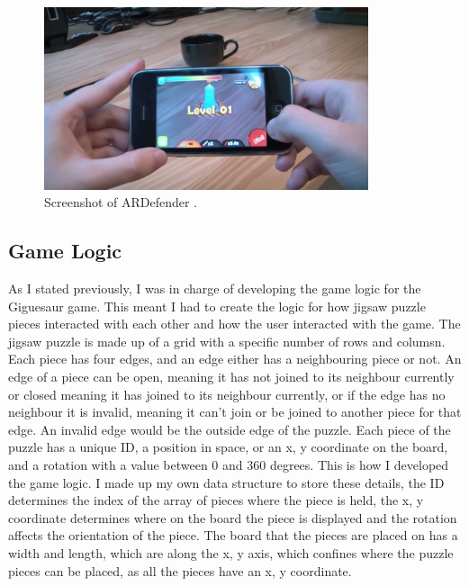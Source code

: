 \documentclass{article}
\begin{document}
\begin{figure}[ht]
\begin{center}
\includegraphics[width=0.85\textwidth]{images/ARDefenderImage}
\caption{Screenshot of ARDefender \cite{img:ARDefender}.}
\label{fig:ARDefender}
\end{center}
\end{figure}

\subsection{Game Logic}
As I stated previously, I was in charge of developing the game logic for the Giguesaur game. This meant I had to create the logic for how jigsaw puzzle pieces interacted with each other and how the user interacted with the game. The jigsaw puzzle is made up of a grid with a specific number of rows and columsn. Each piece has four edges, and an edge either has a neighbouring piece or not. An edge of a piece can be open, meaning it has not joined to its neighbour currently or closed meaning it has joined to its neighbour currently, or if the edge has no neighbour it is invalid, meaning it can't join or be joined to another piece for that edge. An invalid edge would be the outside edge of the puzzle. Each piece of the puzzle has a unique ID, a position in space, or an x, y coordinate on the board, and a rotation with a value between 0 and 360 degrees. This is how I developed the game logic. I made up my own data structure to store these details, the ID determines the index of the array of pieces where the piece is held, the x, y coordinate determines where on the board the piece is displayed and the rotation affects the orientation of the piece. The board that the pieces are placed on has a width and length, which are along the x, y axis, which confines where the puzzle pieces can be placed, as all the pieces have an x, y coordinate. 
\end{document}
